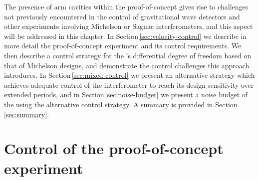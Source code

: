 




The presence of arm cavities within the proof-of-concept \SSM{} gives rise to challenges not previously encountered in the control of gravitational wave detectors and other experiments involving Michelson or Sagnac interferometers, and this aspect will be addressed in this chapter. In Section\,\ref{sec:velocity-control} we describe in more detail the proof-of-concept \SSM{} experiment and its control requirements. We then describe a control strategy for the \SSM{}'s differential degree of freedom based on that of Michelson designs, and demonstrate the control challenges this approach introduces. In Section\,\ref{sec:mixed-control} we present an alternative strategy which achieves adequate control of the interferometer to reach its design sensitivity over extended periods, and in Section\,\ref{sec:noise-budget} we present a noise budget of the \SSM{} using the alternative control strategy. A summary is provided in Section\,\ref{sec:summary}.


\section{Control of the proof-of-concept experiment}


